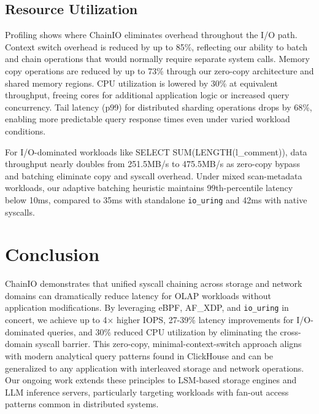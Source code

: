 \documentclass[sigconf,10pt]{acmart}
\newcommand{\sys}{ChainIO\xspace}
\begin{document}
\subsection{Resource Utilization}

Profiling shows where \sys eliminates overhead throughout the I/O path. Context switch overhead is reduced by up to 85\%, reflecting our ability to batch and chain operations that would normally require separate system calls. Memory copy operations are reduced by up to 73\% through our zero-copy architecture and shared memory regions. CPU utilization is lowered by 30\% at equivalent throughput, freeing cores for additional application logic or increased query concurrency. Tail latency (p99) for distributed sharding operations drops by 68\%, enabling more predictable query response times even under varied workload conditions.

For I/O-dominated workloads like SELECT SUM(LENGTH(l\_comment)), data throughput nearly doubles from 251.5MB/s to 475.5MB/s as zero-copy bypass and batching eliminate copy and syscall overhead. Under mixed scan-metadata workloads, our adaptive batching heuristic maintains 99th-percentile latency below 10ms, compared to 35ms with standalone \texttt{io\_uring} and 42ms with native syscalls.

\section{Conclusion}

\sys demonstrates that unified syscall chaining across storage and network domains can dramatically reduce latency for OLAP workloads without application modifications. By leveraging eBPF, AF\_XDP, and \texttt{io\_uring} in concert, we achieve up to 4× higher IOPS, 27-39\% latency improvements for I/O-dominated queries, and 30\% reduced CPU utilization by eliminating the cross-domain syscall barrier. This zero-copy, minimal-context-switch approach aligns with modern analytical query patterns found in ClickHouse and can be generalized to any application with interleaved storage and network operations. Our ongoing work extends these principles to LSM-based storage engines and LLM inference servers, particularly targeting workloads with fan-out access patterns common in distributed systems.



\end{document}
